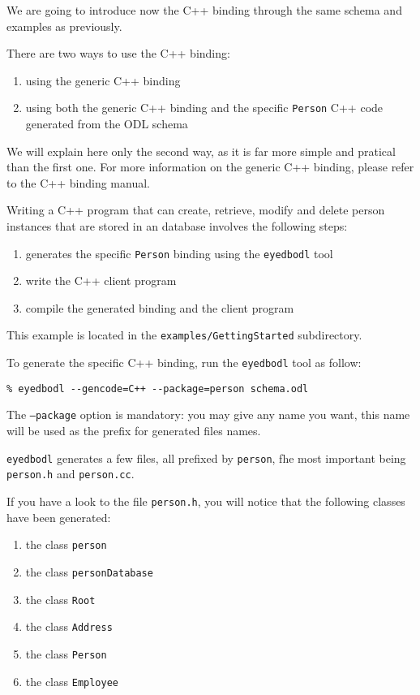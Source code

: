 
We are going to introduce now the C++ binding through the same schema
and examples as previously.

There are two ways to use the C++ binding: 
\begin{enumerate}
\item using the generic C++ binding
\item using both the generic C++ binding and the specific \texttt{Person} C++ code generated from the ODL schema
\end{enumerate}

We will explain here only the second way, as it is far more simple and pratical than the first one. For more information on the generic C++ binding, please refer to the C++ binding manual.

Writing a C++ program that can create, retrieve, modify and delete person instances that are stored in an \eyedb database involves the following steps:
\begin{enumerate}
\item generates the specific \texttt{Person} binding using the \texttt{eyedbodl} tool
\item write the C++ client program
\item compile the generated binding and the client program
\end{enumerate}

This example is located in the \texttt{examples/GettingStarted} subdirectory.


To generate the specific C++ binding, run the \texttt{eyedbodl} tool as follow:
\verbsize \begin{verbatim}
% eyedbodl --gencode=C++ --package=person schema.odl
\end{verbatim}
\normalsize
The \texttt{--package} option is mandatory: you may give any name you want, this name will 
be used as the prefix for generated files names.

\texttt{eyedbodl} generates a few files, all prefixed by \texttt{person}, fhe most important 
being \texttt{person.h} and \texttt{person.cc}.

If you have a look to the file \texttt{person.h},
you will notice that the following classes have been generated:
\begin{enumerate}
\item the class \texttt{person}
\item the class \texttt{personDatabase}
\item the class \texttt{Root}
\item the class \texttt{Address}
\item the class \texttt{Person}
\item the class \texttt{Employee}
\end{enumerate}

